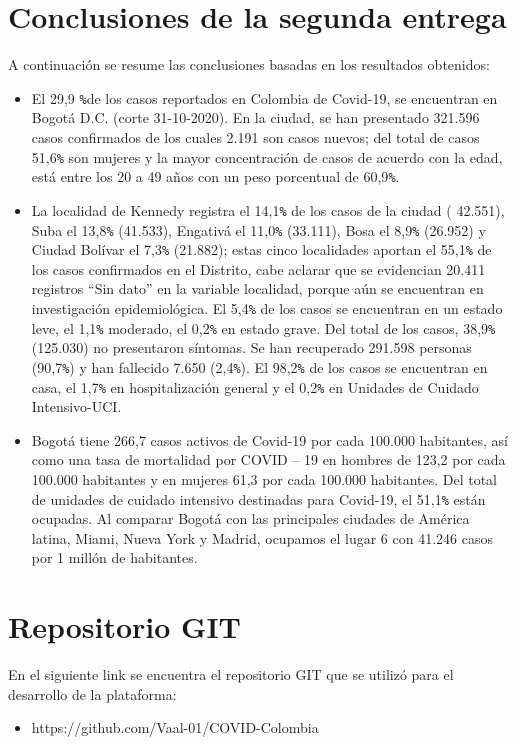 \documentclass[conference,compsoc,onecolumn]{IEEEtran}
\begin{document}
\section{Conclusiones de la segunda entrega}
A continuación se resume las conclusiones basadas en los resultados obtenidos: 
\label{sec:conclusions}
\begin{itemize}
    
    \item El 29,9 \verb|%|de los casos reportados en Colombia de Covid-19, se encuentran en Bogotá D.C. (corte 31-10-2020). En la ciudad, se han presentado 321.596 casos confirmados de los cuales 2.191 son casos nuevos; del total de casos 51,6\verb|%| son mujeres y la mayor concentración de casos de acuerdo con la edad, está entre los 20 a 49 años con un peso porcentual de 60,9\verb|%|.
    
    \item La localidad de Kennedy registra el 14,1\verb|%| de los casos de la ciudad ( 42.551), Suba el 13,8\verb|%| (41.533), Engativá el 11,0\verb|%| (33.111), Bosa el 8,9\verb|%| (26.952) y Ciudad Bolívar el 7,3\verb|%| (21.882); estas cinco localidades aportan el 55,1\verb|%| de los casos confirmados en el Distrito, cabe aclarar que se evidencian 20.411 registros “Sin dato” en la variable localidad, porque aún se encuentran en investigación epidemiológica. El 5,4\verb|%| de los casos se encuentran en un estado leve, el 1,1\verb|%| moderado, el 0,2\verb|%| en estado grave. Del total de los casos, 38,9\verb|%| (125.030) no presentaron síntomas. Se han recuperado 291.598 personas (90,7\verb|%|) y han fallecido 7.650 (2,4\verb|%|). El 98,2\verb|%| de los casos se encuentran en casa, el 1,7\verb|%| en hospitalización general y el 0,2\verb|%| en Unidades de Cuidado Intensivo-UCI.
    
    \item Bogotá tiene 266,7 casos activos de Covid-19 por cada 100.000 habitantes, así como una tasa de mortalidad por COVID – 19 en hombres de 123,2 por cada 100.000 habitantes y en mujeres 61,3 por cada 100.000 habitantes. Del total de unidades de cuidado intensivo destinadas para Covid-19, el 51,1\verb|%| están ocupadas. Al comparar Bogotá con las principales ciudades de América latina, Miami, Nueva York y Madrid, ocupamos el lugar 6 con 41.246 casos por 1 millón de habitantes.
    
\end{itemize}

\section{Repositorio GIT}
En el siguiente link se encuentra el repositorio GIT que se utilizó para el desarrollo de la plataforma:
\begin{itemize}
\item https://github.com/Vaal-01/COVID-Colombia
\end{itemize}

\nocite{*}

\label{sec:biblio}
 





\end{document}
